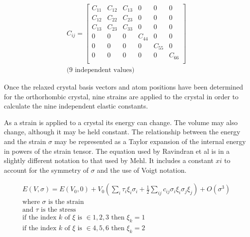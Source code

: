 \begin{equation}
    \begin{split}
      C_{ij} = 
      \begin{bmatrix}
      C_{11} & C_{12} & C_{13} & 0      & 0      & 0      \\
      C_{12} & C_{22} & C_{23} & 0      & 0      & 0      \\
      C_{13} & C_{23} & C_{33} & 0      & 0      & 0      \\
      0      & 0      & 0      & C_{44} & 0      & 0      \\
      0      & 0      & 0      & 0      & C_{55} & 0      \\
      0      & 0      & 0      & 0      & 0      & C_{66} \\
      \end{bmatrix}\\
      \text{(9 independent values)}
    \end{split}
    \label{eq:eqOrthoRhombicEC}
\end{equation}


Once the relaxed crystal basis vectors and atom positions have been determined for the orthorhombic crystal, nine strains are applied to the crystal \cite{dftrfkj} in order to calculate the nine independent elastic constants.


\FloatBarrier

As a strain is applied to a crystal its energy can change.  The volume may also change, although it may be held constant.  The relationship between the energy and the strain $\sigma$ may be represented as a Taylor expansion of the internal energy in powers of the strain tensor\cite{dftrfkj}.  The equation used by Ravindran et al is in a slightly different notation to that used by Mehl\cite{elasticpropertiesmehl}.  It includes a constant $xi$ to account for the symmetry of $\sigma$ and the use of Voigt notation.

\begin{equation}
  \begin{split}
  E(V,\sigma) = E(V_{0},0) + V_{0} \left( \sum_{i} \tau_i \xi_i \sigma_i + \frac{1}{2} \sum_{ij} c_{ij} \sigma_{i} \xi_{i} \sigma_{j} \xi_{j} \right) + O(\sigma^3) \\
\text{where } \sigma \text{ is the strain} \\
\text{and } \tau \text{ is the stress} \\
\text{if the index } k \text{ of } \xi \text{ is } \in {1, 2, 3} \text{ then } \xi_k = 1 \\
\text{if the index } k \text{ of } \xi \text{ is } \in {4, 5, 6} \text{ then } \xi_k = 2 \\
  \end{split}
\end{equation}


